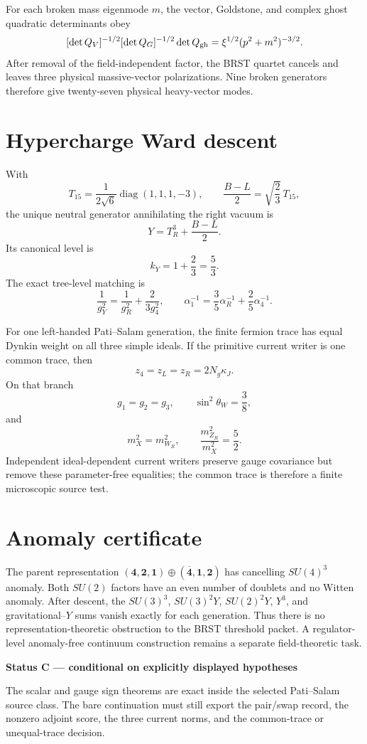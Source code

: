 \documentclass[11pt,oneside,openany]{book}
\numberwithin{equation}{chapter}
\theoremstyle{definition}
\theoremstyle{remark}
\newcommand{\diag}{\operatorname{diag}}
\newenvironment{statusbox}[2]{%
  \par\medskip\noindent
  \begin{center}\begin{minipage}{0.94\textwidth}
  \colorbox{#1!8}{\parbox{\dimexpr\linewidth-2\fboxsep\relax}{\textbf{#2}}}\par\smallskip
}{%
  \end{minipage}\end{center}\medskip
}
\newcommand{\Conditional}[1]{\begin{statusbox}{CondColor}{Status C --- conditional on explicitly displayed hypotheses}#1\end{statusbox}}
\begin{document}
For each broken mass eigenmode \(m\), the vector, Goldstone, and complex ghost
quadratic determinants obey
\[
 [\det Q_V]^{-1/2}[\det Q_G]^{-1/2}\det Q_{\rm gh}
 =\xi^{1/2}(p^2+m^2)^{-3/2}.
\]
After removal of the field-independent factor, the BRST quartet cancels and
leaves three physical massive-vector polarizations.  Nine broken generators
therefore give twenty-seven physical heavy-vector modes.

\section{Hypercharge Ward descent}
With
\[
 T_{15}=\frac1{2\sqrt6}\diag(1,1,1,-3),
 \qquad
 \frac{B-L}{2}=\sqrt{\frac23}\,T_{15},
\]
the unique neutral generator annihilating the right vacuum is
\[
 \boxed{Y=T_R^3+\frac{B-L}{2}.}
\]
Its canonical level is
\[
 \boxed{k_Y=1+\frac23=\frac53.}
\]
The exact tree-level matching is
\[
 \boxed{
 \frac1{g_Y^2}=\frac1{g_R^2}+\frac2{3g_4^2},
 \qquad
 \alpha_1^{-1}=\frac35\alpha_R^{-1}+\frac25\alpha_4^{-1}.}
\]

For one left-handed Pati--Salam generation, the finite fermion trace has equal
Dynkin weight on all three simple ideals.  If the primitive current writer is
one common trace, then
\[
 \boxed{z_4=z_L=z_R=2N_g\kappa_J.}
\]
On that branch
\[
 \boxed{g_1=g_2=g_3,\qquad \sin^2\theta_W=\frac38,}
\]
and
\[
 m_X^2=m_{W_R}^2,
 \qquad
 \frac{m_{Z_R}^2}{m_X^2}=\frac52.
\]
Independent ideal-dependent current writers preserve gauge covariance but
remove these parameter-free equalities; the common trace is therefore a
finite microscopic source test.

\section{Anomaly certificate}
The parent representation
\((\mathbf4,\mathbf2,\mathbf1)\oplus
(\overline{\mathbf4},\mathbf1,\mathbf2)\) has cancelling \(SU(4)^3\)
anomaly.  Both \(SU(2)\) factors have an even number of doublets and no Witten
anomaly.  After descent, the \(SU(3)^3\), \(SU(3)^2Y\), \(SU(2)^2Y\),
\(Y^3\), and gravitational--\(Y\) sums vanish exactly for each generation.
Thus there is no representation-theoretic obstruction to the BRST threshold
packet.  A regulator-level anomaly-free continuum construction remains a
separate field-theoretic task.

\Conditional{The scalar and gauge sign theorems are exact inside the selected
Pati--Salam source class.  The bare continuation must still export the
pair/swap record, the nonzero adjoint score, the three current norms, and the
common-trace or unequal-trace decision.}
\end{document}
